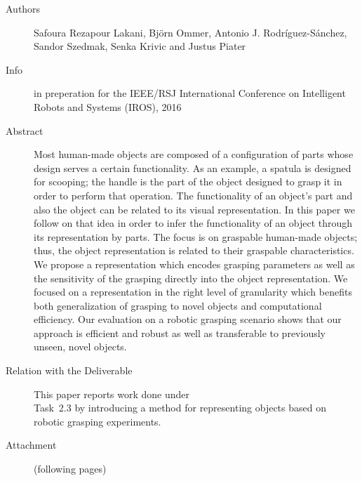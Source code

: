 \documentclass[a4paper,11pt,pdf]{pacmanreport}
\begin{document}
\begin{description}
\item[Authors] Safoura Rezapour Lakani, Bj\"{o}rn Ommer, Antonio J. Rodr\'{i}guez-S\'{a}nchez, Sandor Szedmak, Senka Krivic and Justus Piater
\item[Info] in preperation for the IEEE/RSJ International Conference on Intelligent Robots and Systems (IROS), 2016
\item[Abstract] Most human-made objects are composed of a configuration of parts whose
design serves a certain functionality. As an example, a spatula is
designed for scooping; the handle is the part of the object designed
to grasp it in order to perform that operation. The functionality of
an object's part and also the object can be related to its visual
representation. In this paper we follow on that idea in order to infer
the functionality of an object through its representation by parts.
The focus is on graspable human-made objects; thus, the object
representation is related to their graspable characteristics. We propose a representation which encodes grasping parameters as well as the sensitivity of the grasping directly into the object representation. We focused on a representation in the right level of granularity which benefits both generalization of grasping to novel objects and computational efficiency.
Our evaluation on a robotic grasping scenario shows that our approach
is efficient and robust as well as transferable to previously unseen,
novel objects.
\item[Relation with the Deliverable]\hfill This paper reports work
  done under\\ Task~2.3 by introducing a method for representing
  objects based on robotic grasping experiments.
\item[Attachment] (following pages)
\end{description}

%

\end{document}
